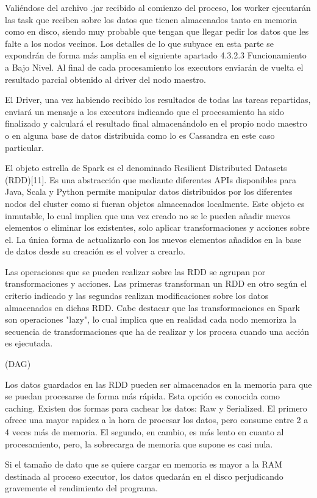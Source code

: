 Valiéndose del archivo .jar recibido al comienzo del proceso, los worker ejecutarán las task que reciben sobre los datos que tienen almacenados tanto en memoria como en disco, siendo muy probable que tengan que llegar pedir los datos que les falte a los nodos vecinos. Los detalles de lo que subyace en esta parte se expondrán de forma más amplia en el siguiente apartado 4.3.2.3 Funcionamiento a Bajo Nivel. Al final de cada procesamiento los executors enviarán de vuelta el resultado parcial obtenido al driver del nodo maestro.

El Driver, una vez habiendo recibido los resultados de todas las tareas repartidas, enviará un mensaje a los executors indicando que el procesamiento ha sido finalizado y calculará el resultado final almacenándolo en el propio nodo maestro o en alguna base de datos distribuida como lo es Cassandra en este caso particular.

El objeto estrella de Spark es el denominado Resilient Distributed Datasets (RDD)[11]. Es una abstracción que mediante diferentes APIs disponibles para Java, Scala y Python permite manipular datos distribuidos por los diferentes nodos del cluster como si fueran objetos almacenados localmente. Este objeto es inmutable, lo cual implica que una vez creado no se le pueden añadir nuevos elementos o eliminar los existentes, solo aplicar transformaciones y acciones sobre el. La única forma de actualizarlo con los nuevos elementos añadidos en la base de datos desde su creación es el volver a crearlo.

Las operaciones que se pueden realizar sobre las RDD se agrupan por transformaciones y acciones. Las primeras transforman un RDD en otro según el criterio indicado y las segundas realizan modificaciones sobre los datos almacenados en dichas RDD. Cabe destacar que las transformaciones en Spark son operaciones "lazy", lo cual implica que en realidad cada nodo memoriza la secuencia de transformaciones que ha de realizar y los procesa cuando una acción es ejecutada.    

(DAG)

Los datos guardados en las RDD pueden ser almacenados en la memoria para que se puedan procesarse de forma más rápida. Esta opción es conocida como caching. Existen dos formas para cachear los datos: Raw y Serialized. El primero ofrece una mayor rapidez a la hora de procesar los datos, pero consume entre 2 a 4 veces más de memoria. El segundo, en cambio, es más lento en cuanto al procesamiento, pero, la sobrecarga de memoria que supone es casi nula. 

Si el tamaño de dato que se quiere cargar en memoria es mayor a la RAM destinada al proceso executor, los datos quedarán en el disco perjudicando gravemente el rendimiento del programa.




